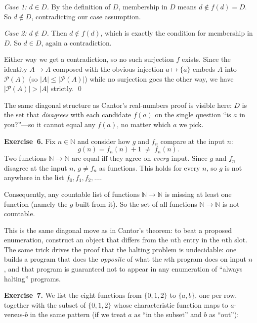 \documentclass[11pt]{article}
\begin{document}
\emph{Case 1: $d \in D$.}  By the definition of $D$, membership in $D$
means $d \notin f(d) = D$.  So $d \notin D$, contradicting our case
assumption.

\emph{Case 2: $d \notin D$.}  Then $d \notin f(d)$, which is exactly
the condition for membership in $D$.  So $d \in D$, again a
contradiction.

Either way we get a contradiction, so no such surjection $f$ exists.
Since the identity $A \to A$ composed with the obvious injection
$a \mapsto \{a\}$ embeds $A$ into $\mathcal{P}(A)$ (so
$|A| \leq |\mathcal{P}(A)|$) while no surjection goes the other way,
we have $|\mathcal{P}(A)| > |A|$ strictly.  \qed

The same diagonal structure as Cantor's real-numbers proof is visible
here: $D$ is the set that \emph{disagrees} with each candidate $f(a)$
on the single question ``is $a$ in you?''---so it cannot equal any
$f(a)$, no matter which $a$ we pick.

\medskip
\textbf{Exercise~6.}
Fix $n \in \mathbb{N}$ and consider how $g$ and $f_n$ compare at the
input $n$:
\[
  g(n) = f_n(n) + 1 \;\neq\; f_n(n).
\]
Two functions $\mathbb{N} \to \mathbb{N}$ are equal iff they agree on
\emph{every} input.  Since $g$ and $f_n$ disagree at the input $n$,
$g \neq f_n$ as functions.  This holds for every $n$, so $g$ is not
anywhere in the list $f_0, f_1, f_2, \ldots$.

Consequently, any countable list of functions $\mathbb{N} \to
\mathbb{N}$ is missing at least one function (namely the $g$ built from
it).  So the set of all functions $\mathbb{N} \to \mathbb{N}$ is not
countable.

This is the same diagonal move as in Cantor's theorem: to beat a
proposed enumeration, construct an object that differs from the $n$th
entry in the $n$th slot.  The same trick drives the proof that the
halting problem is undecidable: one builds a program that does the
\emph{opposite} of what the $n$th program does on input $n$, and that
program is guaranteed not to appear in any enumeration of ``always
halting'' programs.

\medskip
\textbf{Exercise~7.}
We list the eight functions from $\{0, 1, 2\}$ to $\{a, b\}$, one per row,
together with the subset of $\{0, 1, 2\}$ whose characteristic function
maps to $a$-versus-$b$ in the same pattern (if we treat $a$ as ``in the
subset'' and $b$ as ``out''):
\end{document}
